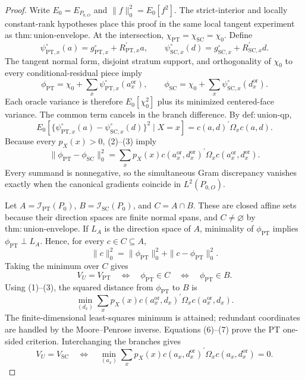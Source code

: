 \documentclass{article}
\begin{document}
\begin{proof}
Write \(E_0=E_{P_{0,O}}\) and \(\|f\|_0^2=E_0[f^2]\).  The strict-interior and locally constant-rank hypotheses place this proof in the same local tangent experiment as \(\mathrm{thm{:}union\text{-}envelope}\).  At the intersection, \(\chi_{\mathrm{PT}}=\chi_{\mathrm{SC}}=\chi_0\).  Define
\[
 \psi^{\circ}_{\mathrm{PT},x}(a)=g^{\circ}_{\mathrm{PT},x}+R_{\mathrm{PT},x}^{\prime}a,
 \qquad
 \psi^{\circ}_{\mathrm{SC},x}(d)=g^{\circ}_{\mathrm{SC},x}+R_{\mathrm{SC},x}^{\prime}d.
 \tag{1}
\]
The tangent normal form, disjoint stratum support, and orthogonality of \(\chi_0\) to every conditional-residual piece imply
\[
 \phi_{\mathrm{PT}}=\chi_0+\sum_x\psi^{\circ}_{\mathrm{PT},x}(a_x^{\mathrm{or}}),
 \qquad
 \phi_{\mathrm{SC}}=\chi_0+\sum_x\psi^{\circ}_{\mathrm{SC},x}(d_x^{\mathrm{or}}).
 \tag{2}
\]
Each oracle variance is therefore \(E_0[\chi_0^2]\) plus its minimized centered-face variance.  The common term cancels in the branch difference.  By \(\mathrm{def{:}union\text{-}qp}\),
\[
 E_0[\{\psi^{\circ}_{\mathrm{PT},x}(a)-\psi^{\circ}_{\mathrm{SC},x}(d)\}^2\mid X=x]
 =c(a,d)^{\prime}\Omega_xc(a,d).
 \tag{3}
\]
Because every \(p_X(x)>0\), (2)--(3) imply
\[
 \|\phi_{\mathrm{PT}}-\phi_{\mathrm{SC}}\|_0^2
 =\sum_xp_X(x)c(a_x^{\mathrm{or}},d_x^{\mathrm{or}})^{\prime}
 \Omega_xc(a_x^{\mathrm{or}},d_x^{\mathrm{or}}).
 \tag{4}
\]
Every summand is nonnegative, so the simultaneous Gram discrepancy vanishes exactly when the canonical gradients coincide in \(L^2(P_{0,O})\).

Let \(A=\mathcal I_{\mathrm{PT}}(P_0)\), \(B=\mathcal I_{\mathrm{SC}}(P_0)\), and \(C=A\cap B\).  These are closed affine sets because their direction spaces are finite normal spans, and \(C\ne\varnothing\) by \(\mathrm{thm{:}union\text{-}envelope}\).  If \(L_A\) is the direction space of \(A\), minimality of \(\phi_{\mathrm{PT}}\) implies \(\phi_{\mathrm{PT}}\perp L_A\).  Hence, for every \(c\in C\subseteq A\),
\[
 \|c\|_0^2=\|\phi_{\mathrm{PT}}\|_0^2+\|c-\phi_{\mathrm{PT}}\|_0^2.
 \tag{5}
\]
Taking the minimum over \(C\) gives
\[
 V_U=V_{\mathrm{PT}}
 \quad\Longleftrightarrow\quad
 \phi_{\mathrm{PT}}\in C
 \quad\Longleftrightarrow\quad
 \phi_{\mathrm{PT}}\in B.
 \tag{6}
\]
Using (1)--(3), the squared distance from \(\phi_{\mathrm{PT}}\) to \(B\) is
\[
 \min_{(d_x)}\sum_xp_X(x)c(a_x^{\mathrm{or}},d_x)^{\prime}
 \Omega_xc(a_x^{\mathrm{or}},d_x).
 \tag{7}
\]
The finite-dimensional least-squares minimum is attained; redundant coordinates are handled by the Moore--Penrose inverse.  Equations (6)--(7) prove the PT one-sided criterion.  Interchanging the branches gives
\[
 V_U=V_{\mathrm{SC}}
 \quad\Longleftrightarrow\quad
 \min_{(a_x)}\sum_xp_X(x)c(a_x,d_x^{\mathrm{or}})^{\prime}
 \Omega_xc(a_x,d_x^{\mathrm{or}})=0.
 \tag{8}
\]


\end{proof}
\end{document}
